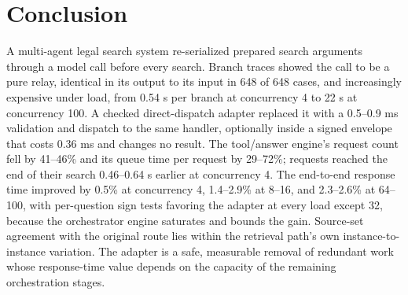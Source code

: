 \documentclass[paper]{ieice}
\begin{document}
\section{Conclusion}
A multi-agent legal search system re-serialized prepared search arguments through a model call before every search. Branch traces showed the call to be a pure relay, identical in its output to its input in 648 of 648 cases, and increasingly expensive under load, from 0.54 s per branch at concurrency 4 to 22 s at concurrency 100. A checked direct-dispatch adapter replaced it with a 0.5--0.9 ms validation and dispatch to the same handler, optionally inside a signed envelope that costs 0.36 ms and changes no result. The tool/answer engine's request count fell by 41--46\% and its queue time per request by 29--72\%; requests reached the end of their search 0.46--0.64 s earlier at concurrency 4. The end-to-end response time improved by 0.5\% at concurrency 4, 1.4--2.9\% at 8--16, and 2.3--2.6\% at 64--100, with per-question sign tests favoring the adapter at every load except 32, because the orchestrator engine saturates and bounds the gain. Source-set agreement with the original route lies within the retrieval path's own instance-to-instance variation. The adapter is a safe, measurable removal of redundant work whose response-time value depends on the capacity of the remaining orchestration stages.
\end{document}
